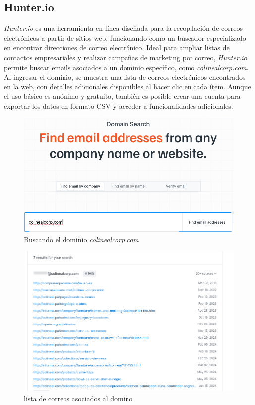 \documentclass[12pt]{article}
\begin{document}
                \subsection{Hunter.io}
                        \textit{Hunter.io} es una herramienta en línea diseñada para la recopilación de correos electrónicos a partir de sitios web, funcionando como un buscador especializado en encontrar direcciones de correo electrónico. Ideal para ampliar listas de contactos empresariales y realizar campañas de marketing por correo, \textit{Hunter.io} permite buscar emails asociados a un dominio específico, como \textit{colinealcorp.com}. Al ingresar el dominio, se muestra una lista de correos electrónicos encontrados en la web, con detalles adicionales disponibles al hacer clic en cada ítem. Aunque el uso básico es anónimo y gratuito, también es posible crear una cuenta para exportar los datos en formato CSV y acceder a funcionalidades adicionales.
                        
                        \begin{figure}[!h]
                                \centering
                                \includegraphics[width=1\textwidth]{img/hunter-1.png}
                                \caption{Buscando el dominio \textit{colinealcorp.com}}
                        \end{figure}

                        \begin{figure}[!h]
                                \centering
                                \includegraphics[width=1\textwidth]{img/hunter-2.png}
                                \caption{lista de correos asociados al domino}
                        \end{figure}
\end{document}
